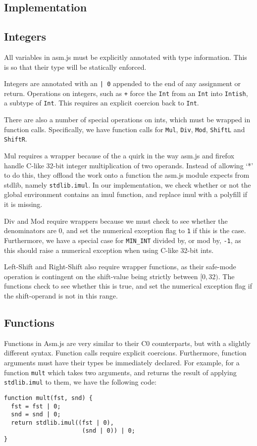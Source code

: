 \documentclass[twoside]{article}
\begin{document}
\begin{multicols}{2}

\section{Implementation}

  \subsection{Integers}
    All variables in asm.js must be explicitly annotated with type information.
    This is so that their type will be statically enforced.

    Integers are annotated with an \texttt{| 0} appended to the end of any
    assignment or return. Operations on integers, such as \texttt{+} force
    the \texttt{Int} from an \texttt{Int} into \texttt{Intish}, a subtype of \texttt{Int}. 
    This requires an explicit coercion back to \texttt{Int}.

    There are also a number of special operations on ints, which must be
    wrapped in function calls. Specifically, we have function calls for \texttt{Mul},
    \texttt{Div}, \texttt{Mod}, \texttt{ShiftL} and \texttt{ShiftR}. 
    
    Mul requires a 
    wrapper because of the a quirk in the way asm.js and firefox handle C-like 32-bit integer 
    multiplication of two operands. Instead of allowing `*' to do this, they offload the work
    onto a function the asm.js module expects from stdlib, namely \texttt{stdlib.imul}. In 
    our implementation, we check whether or not the global environment contains an imul function,
    and replace imul with a polyfill if it is missing. 

    Div and Mod require wrappers because we must check to see whether the denominators are 0,
    and set the numerical exception flag to \texttt{1} if this is the case. Furthermore, we have
    a special case for \texttt{MIN\_INT} divided by, or mod by, \texttt{-1}, as this should raise
    a numerical exception when using C-like 32-bit ints. 

    Left-Shift and Right-Shift also require wrapper functions, as their safe-mode operation
    is contingent on the shift-value being strictly between $[0,32)$. The functions check
    to see whether this is true, and set the numerical exception flag if the shift-operand is
    not in this range. 
  \subsection{Functions}
    Functions in Asm.js are very similar to their C0 counterparts, but with a
    slightly different syntax. Function calls require explicit coercions. Furthermore,
    function arguments must have their types be immediately declared. For example, for
    a function \texttt{mult} which takes two arguments, and returns the result of applying
    \texttt{stdlib.imul} to them, we have the following code: 
\begin{verbatim}
function mult(fst, snd) {
  fst = fst | 0;
  snd = snd | 0;
  return stdlib.imul((fst | 0), 
                      (snd | 0)) | 0;
}
\end{verbatim}


\end{multicols}
\end{document}

